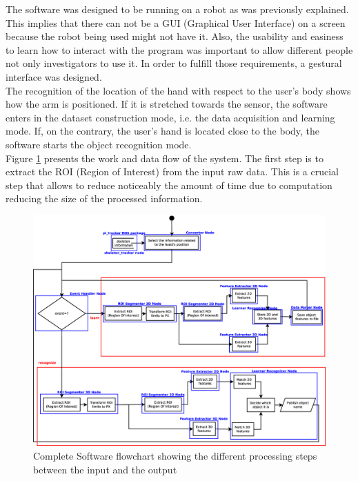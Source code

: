 The software was designed to be running on a robot as was previously explained. 
This implies that there can not be a GUI (Graphical User Interface) on a screen because the robot being used might not have it. 
Also, the usability and easiness to learn how to interact with the program was important to allow different people not only investigators to use it. 
In order to fulfill those requirements, a gestural interface was designed. 
\\

The recognition of the location of the hand with respect to the user's body shows how the arm is positioned. 
If it is stretched towards the sensor, the software enters in the dataset construction mode, i.e. the data acquisition and learning mode. 
If, on the contrary, the user's hand is located close to the body, the software starts the object recognition mode. 
\\

Figure \ref{flowchart} presents the work and data flow of the system. 
The first step is to extract the ROI (Region of Interest) from the input raw data. 
This is a crucial step that allows to reduce noticeably the amount of time due to computation reducing the size of the processed information. 



\begin{figure}[H]
	\begin{center}
\includegraphics[width=\linewidth]{img/diagrams/flowcharts.eps}
	\caption[Software flowchart]{Complete Software flowchart showing the different processing steps between the input and the output}
	\end{center}
	\label{flowchart}
\end{figure}

